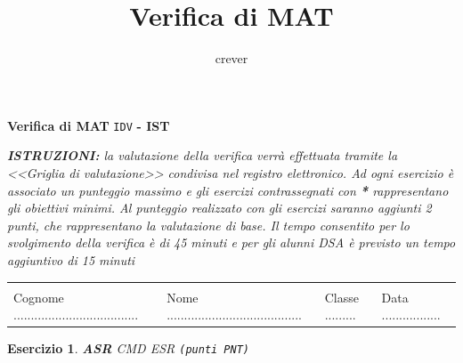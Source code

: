 \documentclass[a4paper,12pt]{article}
\title{Verifica di {MAT} }
\author{crever}
\theoremstyle{plain}
\newtheorem{esercizio}{Esercizio}
\begin{document}

\begin{center}
	{\textbf{Verifica di {MAT}} \verb!IDV! \textbf{- {IST} }}
\end{center}

\small{\textit{\textbf{ISTRUZIONI:} la valutazione della verifica verrà effettuata tramite la <<Griglia di valutazione>> condivisa nel registro
		elettronico. Ad ogni esercizio è associato un punteggio massimo e gli esercizi contrassegnati con \emph{\textbf{*}} rappresentano gli obiettivi minimi. Al punteggio realizzato con gli esercizi saranno aggiunti 2 punti, che rappresentano la valutazione di base. Il tempo consentito per lo svolgimento della verifica è di 45 minuti e per gli alunni DSA è previsto un tempo aggiuntivo di 15 minuti}}

\begin{center}
	\begin{tabular}{llll}
		\hline
		&  &  & \\
		Cognome .................................... & 
		Nome ....................................... &
		Classe ......... & 
		Data .................\\
		\hline
	\end{tabular}
\end{center}


\begin{esercizio}
	\emph{\textbf{ASR} {CMD}} %
	\medskip
	\newline	
	{ESR}
	\hspace*{\fill} {\verb!(punti PNT)!}
	\medskip
\end{esercizio}	
\end{document}
